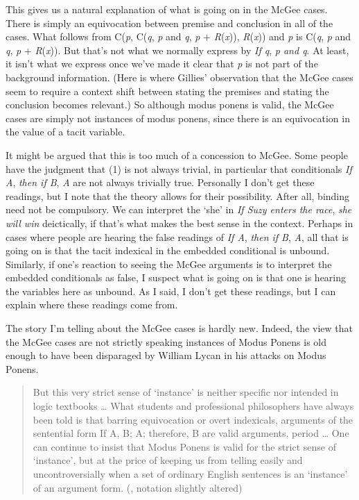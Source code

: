 \documentclass[
  10pt,
  letterpaper,
  DIV=11,
  numbers=noendperiod,
  twoside]{scrartcl}
\begin{document}
This gives us a natural explanation of what is going on in the McGee
cases. There is simply an equivocation between premise and conclusion in
all of the cases. What follows from C(\emph{p}, C(\emph{q}, \emph{p} and
\emph{q}, \emph{p} + \emph{R}(\emph{x})), \emph{R}(\emph{x})) and
\emph{p} is C(\emph{q}, \emph{p} and \emph{q}, \emph{p} +
\emph{R}(\emph{x})). But that's not what we normally express by \emph{If
q}, \emph{p and q}. At least, it isn't what we express once we've made
it clear that \emph{p} is not part of the background information. (Here
is where Gillies' observation that the McGee cases seem to require a
context shift between stating the premises and stating the conclusion
becomes relevant.) So although modus ponens is valid, the McGee cases
are simply not instances of modus ponens, since there is an equivocation
in the value of a tacit variable.

It might be argued that this is too much of a concession to McGee. Some
people have the judgment that (1) is not always trivial, in particular
that conditionals \emph{If A}, \emph{then if B}, \emph{A} are not always
trivially true. Personally I don't get these readings, but I note that
the theory allows for their possibility. After all, binding need not be
compulsory. We can interpret the `she' in \emph{If Suzy enters the
race}, \emph{she will win} deictically, if that's what makes the best
sense in the context. Perhaps in cases where people are hearing the
false readings of \emph{If A}, \emph{then if B}, \emph{A}, all that is
going on is that the tacit indexical in the embedded conditional is
unbound. Similarly, if one's reaction to seeing the McGee arguments is
to interpret the embedded conditionals as false, I suspect what is going
on is that one is hearing the variables here as unbound. As I said, I
don't get these readings, but I can explain where these readings come
from.

The story I'm telling about the McGee cases is hardly new. Indeed, the
view that the McGee cases are not strictly speaking instances of Modus
Ponens is old enough to have been disparaged by William Lycan in his
attacks on Modus Ponens.

\begin{quote}
But this very strict sense of `instance' is neither specific nor
intended in logic textbooks \ldots{} What students and professional
philosophers have always been told is that barring equivocation or overt
indexicals, arguments of the sentential form If A, B; A; therefore, B
are valid arguments, period \ldots{} One can continue to insist that
Modus Ponens is valid for the strict sense of `instance', but at the
price of keeping us from telling easily and uncontroversially when a set
of ordinary English sentences is an `instance' of an argument form.
(, notation slightly altered)
\end{quote}
\end{document}
